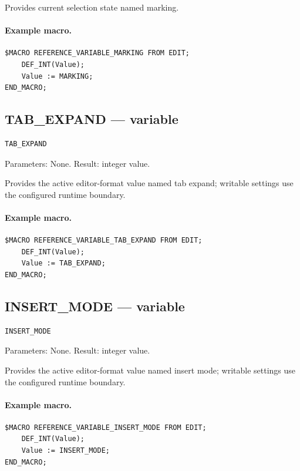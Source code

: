 \documentclass[a4paper,10pt,twoside,openany]{book}
\begin{document}
Provides current selection state named marking.

\paragraph{Example macro.}
\begin{verbatim}
$MACRO REFERENCE_VARIABLE_MARKING FROM EDIT;
    DEF_INT(Value);
    Value := MARKING;
END_MACRO;
\end{verbatim}

\label{prim:variable-tab-expand}
\subsection*{TAB\_EXPAND --- variable}
\begin{verbatim}
TAB_EXPAND
\end{verbatim}
Parameters: None. Result: integer value.

Provides the active editor-format value named tab expand; writable settings use the configured runtime boundary.

\paragraph{Example macro.}
\begin{verbatim}
$MACRO REFERENCE_VARIABLE_TAB_EXPAND FROM EDIT;
    DEF_INT(Value);
    Value := TAB_EXPAND;
END_MACRO;
\end{verbatim}

\label{prim:variable-insert-mode}
\subsection*{INSERT\_MODE --- variable}
\begin{verbatim}
INSERT_MODE
\end{verbatim}
Parameters: None. Result: integer value.

Provides the active editor-format value named insert mode; writable settings use the configured runtime boundary.

\paragraph{Example macro.}
\begin{verbatim}
$MACRO REFERENCE_VARIABLE_INSERT_MODE FROM EDIT;
    DEF_INT(Value);
    Value := INSERT_MODE;
END_MACRO;
\end{verbatim}
\end{document}
